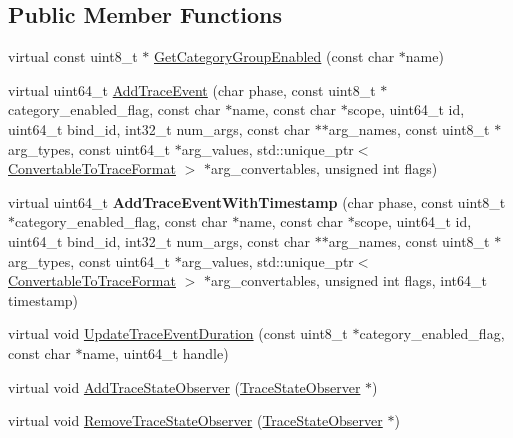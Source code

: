 \subsection*{Public Member Functions}
\begin{DoxyCompactItemize}
\item 
virtual const uint8\+\_\+t $\ast$ \mbox{\hyperlink{classv8_1_1TracingController_af3c0fcec8fe93b18a89392686cfedfe5}{Get\+Category\+Group\+Enabled}} (const char $\ast$name)
\item 
virtual uint64\+\_\+t \mbox{\hyperlink{classv8_1_1TracingController_ad1e234b340ea8f9f1e3386aa21dad5dd}{Add\+Trace\+Event}} (char phase, const uint8\+\_\+t $\ast$category\+\_\+enabled\+\_\+flag, const char $\ast$name, const char $\ast$scope, uint64\+\_\+t id, uint64\+\_\+t bind\+\_\+id, int32\+\_\+t num\+\_\+args, const char $\ast$$\ast$arg\+\_\+names, const uint8\+\_\+t $\ast$arg\+\_\+types, const uint64\+\_\+t $\ast$arg\+\_\+values, std\+::unique\+\_\+ptr$<$ \mbox{\hyperlink{classv8_1_1ConvertableToTraceFormat}{Convertable\+To\+Trace\+Format}} $>$ $\ast$arg\+\_\+convertables, unsigned int flags)
\item 
\mbox{\label{classv8_1_1TracingController_a09a16f1d491260f0fef48eaa3a0a28d7}} 
virtual uint64\+\_\+t {\bfseries Add\+Trace\+Event\+With\+Timestamp} (char phase, const uint8\+\_\+t $\ast$category\+\_\+enabled\+\_\+flag, const char $\ast$name, const char $\ast$scope, uint64\+\_\+t id, uint64\+\_\+t bind\+\_\+id, int32\+\_\+t num\+\_\+args, const char $\ast$$\ast$arg\+\_\+names, const uint8\+\_\+t $\ast$arg\+\_\+types, const uint64\+\_\+t $\ast$arg\+\_\+values, std\+::unique\+\_\+ptr$<$ \mbox{\hyperlink{classv8_1_1ConvertableToTraceFormat}{Convertable\+To\+Trace\+Format}} $>$ $\ast$arg\+\_\+convertables, unsigned int flags, int64\+\_\+t timestamp)
\item 
virtual void \mbox{\hyperlink{classv8_1_1TracingController_ac1fda6cdae5f6515b896b3df05d5a97e}{Update\+Trace\+Event\+Duration}} (const uint8\+\_\+t $\ast$category\+\_\+enabled\+\_\+flag, const char $\ast$name, uint64\+\_\+t handle)
\item 
virtual void \mbox{\hyperlink{classv8_1_1TracingController_a7b86361ffadff46018a348fd2aa01061}{Add\+Trace\+State\+Observer}} (\mbox{\hyperlink{classv8_1_1TracingController_1_1TraceStateObserver}{Trace\+State\+Observer}} $\ast$)
\item 
virtual void \mbox{\hyperlink{classv8_1_1TracingController_ab8d5b3ac795188effb423fa2c0514353}{Remove\+Trace\+State\+Observer}} (\mbox{\hyperlink{classv8_1_1TracingController_1_1TraceStateObserver}{Trace\+State\+Observer}} $\ast$)
\end{DoxyCompactItemize}


